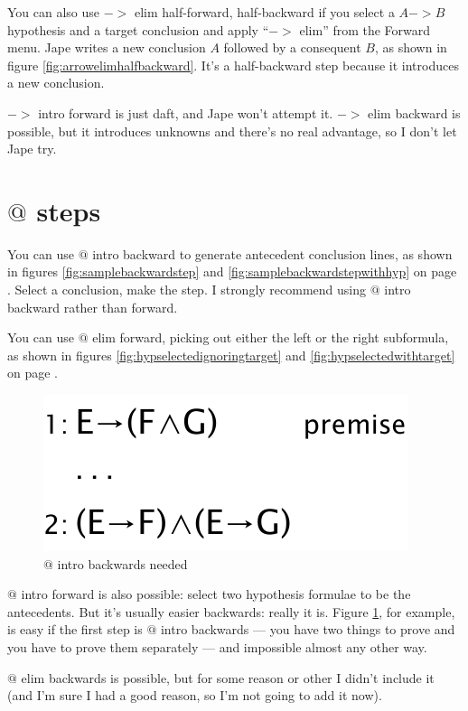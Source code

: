 \documentclass[11pt]{book}
\newcommand{\figref}[1]{figure \ref{fig:#1}}
\newcommand{\Figref}[1]{Figure \ref{fig:#1}}
\begin{document}
You can also use $->$ elim half-forward, half-backward if you select a $A->B$ hypothesis and a target conclusion and apply ``$->$ elim'' from the Forward menu. Jape writes a new conclusion $A$ followed by a consequent $B$, as shown in \figref{arrowelimhalfbackward}. It's a half-backward step because it introduces a new conclusion.

$->$ intro forward is just daft, and Jape won't attempt it. $->$ elim backward is possible, but it introduces unknowns and there's no real advantage, so I don't let Jape try.
 
\section{$@$ steps}

You can use $@$ intro backward to generate antecedent conclusion lines, as shown in figures \ref{fig:samplebackwardstep} and \ref{fig:samplebackwardstepwithhyp} on page \pageref{fig:samplebackwardstep}. Select a conclusion, make the step. I strongly recommend using $@$ intro backward rather than forward.

You can use $@$ elim forward, picking out either the left or the right subformula, as shown in figures \ref{fig:hypselectedignoringtarget} and \ref{fig:hypselectedwithtarget} on page \pageref{fig:hypselectedignoringtarget}.

\begin{figure}
\centering
\includegraphics[scale=0.5]{pics/@introbackwardsworks}
\caption{$@$ intro backwards needed}
\label{fig:@introbackwardsworks}
\end{figure}

$@$ intro forward is also possible: select two hypothesis formulae to be the antecedents. But it's usually easier backwards: really it is. \Figref{@introbackwardsworks}, for example, is easy if the first step is $@$ intro backwards --- you have two things to prove and you have to prove them separately --- and impossible almost any other way.

$@$ elim backwards is possible, but for some reason or other I didn't include it (and I'm sure I had a good reason, so I'm not going to add it now).
\end{document}
